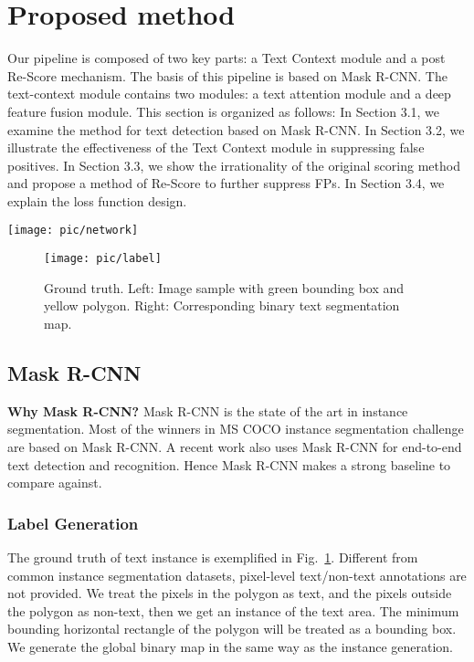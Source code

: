 \documentclass[letterpaper]{article} \usepackage{aaai19}  \usepackage{times}  \usepackage{helvet}  \usepackage{courier}  \usepackage{url}  \usepackage{graphicx}
\begin{document}
\section{Proposed method}
Our pipeline is composed of two key parts: a Text Context module and a post Re-Score mechanism.
The basis of this pipeline is based on Mask R-CNN.
The text-context module contains two modules: a text attention module and a deep feature fusion module.
This section is organized as follows: 
In Section 3.1, we examine the method for text detection based on Mask R-CNN. 
In Section 3.2, we illustrate the effectiveness of the Text Context module in suppressing false positives. 
In Section 3.3, we show the irrationality of the original scoring method and propose a method of Re-Score to further suppress FPs.
In Section 3.4, we explain the loss function design.


\begin{figure*}[htbp]
\centering
\texttt{[image: pic/network]}
\caption{\label{network}{The architecture of our method. (a) The Feature Pyramid Network~(FPN) architecture. (b) Pyramid Feature fusion via TCM. (c) Mask R-CNN branch for text classification, bounding box regression and instance segmentation. (d) The proposed Text-Context Module(TCM). Dotted line indicates the text semantic segmentation branch. The text segmentation map is upsampled to the input image size and calculates the loss with Ground Truth. 
}}
\end{figure*}



\begin{figure}[htbp]
\centering
\texttt{[image: pic/label]}
\caption{\label{label}{Ground truth. Left: Image sample with green bounding box and yellow polygon. Right: Corresponding binary text segmentation map.
}}
\end{figure}


\subsection{Mask R-CNN} 
\textbf{Why Mask R-CNN?} 
Mask R-CNN is the state of the art in instance segmentation.
 Most of the winners in MS COCO instance segmentation challenge are based on Mask R-CNN.
A recent work \cite{lyu2018mask} also uses Mask R-CNN for end-to-end text detection and recognition.
 Hence Mask R-CNN makes a strong baseline to compare against.

\subsubsection{Label Generation} 
The ground truth of text instance is exemplified in Fig.~\ref{label}. Different from common instance segmentation datasets, pixel-level text/non-text annotations are not provided. We treat the pixels in the polygon as text, and the pixels outside the polygon as non-text, then we get an instance of the text area. The minimum bounding horizontal rectangle of the polygon will be treated as a bounding box. We generate the global binary map in the same way as the instance generation.
 
\end{document}
